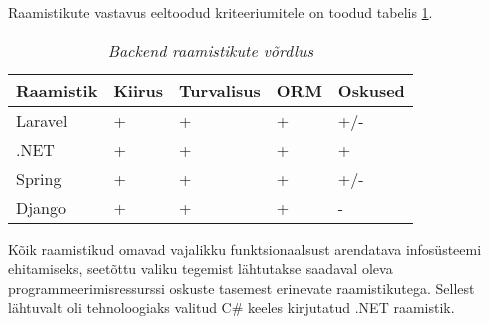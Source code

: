 Raamistikute vastavus eeltoodud kriteeriumitele on toodud tabelis \ref{tab:requirements}.
\begin{longtable}{|p{3cm}|p{2.5cm}|p{2.5cm}|p{2.5cm}|p{2.5cm}|}
	\caption{\it{Backend raamistikute võrdlus}}
	\label{tab:requirements}\\ \hline
	\textbf{Raamistik} &  \textbf{Kiirus} & \textbf{Turvalisus}  & \textbf{ORM} & \textbf{Oskused} \\
	\hline
	\endhead
	\endfoot
	\hline
	\endlastfoot
Laravel & + & + & + & +/-  \\ \hline
.NET    & + & + & + & +  \\ \hline
Spring  & + & + & + & +/-  \\ \hline
Django  & + & + & + & -  \\ \hline
\end{longtable}

Kõik raamistikud omavad vajalikku funktsionaalsust arendatava infosüsteemi ehitamiseks, seetõttu valiku tegemist 
lähtutakse saadaval oleva programmeerimisressurssi oskuste tasemest erinevate raamistikutega. Sellest lähtuvalt
oli tehnoloogiaks valitud C\# keeles kirjutatud .NET raamistik.